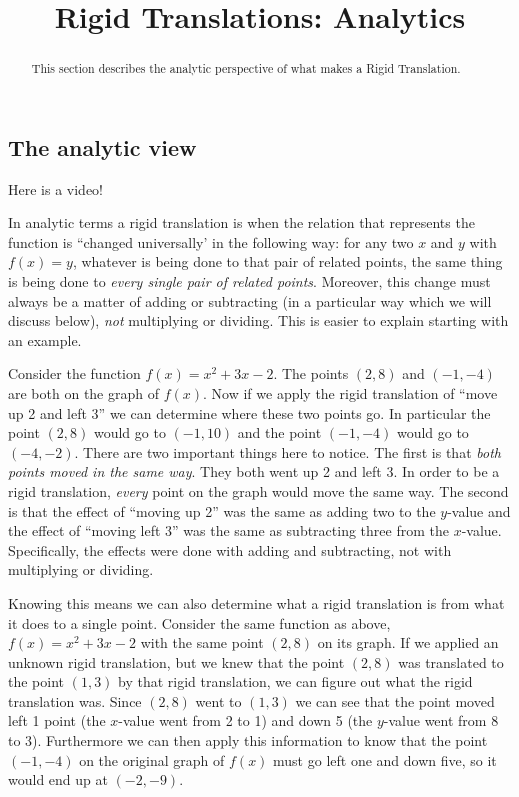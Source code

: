 \documentclass{ximera}
\title{Rigid Translations: Analytics}
\begin{document}
\begin{abstract}
    This section describes the analytic perspective of what makes a Rigid Translation.
\end{abstract}
\maketitle

\subsection*{The analytic view}
    
    Here is a video!
    
    
    In analytic terms a rigid translation is when the relation that represents the function is ``changed universally' in the following way: for any two $x$ and $y$ with $f(x) = y$, whatever is being done to that pair of related points, the same thing is being done to \textit{every single pair of related points}. Moreover, this change must always be a matter of adding or subtracting (in a particular way which we will discuss below), \textit{not} multiplying or dividing. This is easier to explain starting with an example. 
    
    \begin{explanation}
        Consider the function $f(x) = x^2 + 3x - 2$. The points $(2,8)$ and $(-1,-4)$ are both on the graph of $f(x)$. Now if we apply the rigid translation of ``move up 2 and left 3'' we can determine where these two points go. In particular the point $(2,8)$ would go to $(-1,10)$ and the point $(-1,-4)$ would go to $(-4,-2)$. There are two important things here to notice. The first is that \textit{both points moved in the same way}. They both went up 2 and left 3. In order to be a rigid translation, \textit{every} point on the graph would move the same way. The second is that the effect of ``moving up 2'' was the same as adding two to the $y$-value and the effect of ``moving left 3'' was the same as subtracting three from the $x$-value. Specifically, the effects were done with adding and subtracting, not with multiplying or dividing.
        
        Knowing this means we can also determine what a rigid translation is from what it does to a single point. Consider the same function as above, $f(x) = x^2 + 3x - 2$ with the same point $(2,8)$ on its graph. If we applied an unknown rigid translation, but we knew that the point $(2,8)$ was translated to the point $(1,3)$ by that rigid translation, we can figure out what the rigid translation was. Since $(2,8)$ went to $(1,3)$ we can see that the point moved left 1 point (the $x$-value went from 2 to 1) and down 5 (the $y$-value went from 8 to 3). Furthermore we can then apply this information to know that the point $(-1,-4)$ on the original graph of $f(x)$ must go left one and down five, so it would end up at $(-2,-9)$.
    \end{explanation}
        
\end{document}
